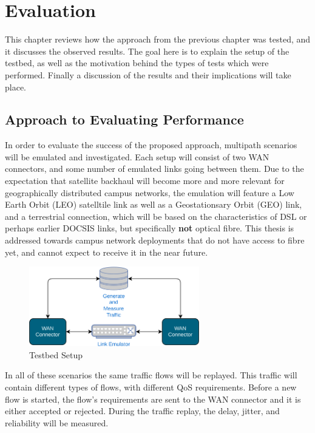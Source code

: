 
\cleardoublepage
\chapter{Evaluation}
\label{cha:evaluation}

This chapter reviews how the approach from the previous chapter was tested, and it discusses the observed results. The goal here is to explain the setup of the testbed, as well as the motivation behind the types of tests which were performed. Finally a discussion of the results and their implications will take place.


\section{Approach to Evaluating Performance}

In order to evaluate the success of the proposed approach, multipath scenarios will be emulated and investigated. Each setup will consist of two WAN connectors, and some number of emulated links going between them. Due to the expectation that satellite backhaul will become more and more relevant for geographically distributed campus networks, the emulation will feature a Low Earth Orbit (LEO) satelltile link as well as a Geostationsary Orbit (GEO) link, and a terrestrial connection, which will be based on the characteristics of DSL or perhaps earlier DOCSIS links, but specifically \textbf{not} optical fibre. This thesis is addressed towards campus network deployments that do not have access to fibre yet, and cannot expect to receive it in the near future.

\begin{figure}[h]
    \centering
        \includegraphics[width=0.66\textwidth]{fig/testbed.png}
        \caption{Testbed Setup}
        \label{fig:testbed}
\end{figure}

In all of these scenarios the same traffic flows will be replayed. This traffic will contain different types of flows, with different QoS requirements. Before a new flow is started, the flow's requirements are sent to the WAN connector and it is either accepted or rejected. During the traffic replay, the delay, jitter, and reliability will be measured.


